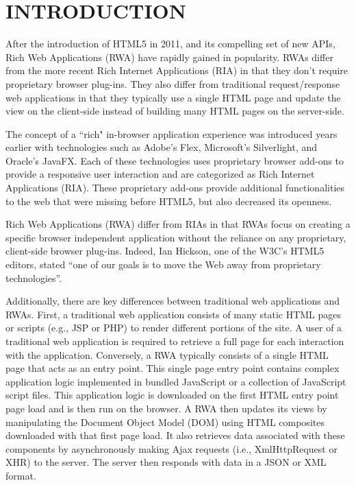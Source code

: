 \chapter{\uppercase{INTRODUCTION}}
\thispagestyle{empty}

After the introduction of HTML5 in 2011, and its compelling set of new APIs\cite{hickson2010html5}, Rich Web Applications (RWA) have rapidly gained in popularity.  RWAs differ from the more recent Rich Internet Applications (RIA) in that they don't require proprietary browser plug-ins.  They also differ from traditional request/response web applications in that they typically use a single HTML page and update the view on the client-side instead of building many HTML pages on the server-side.

The concept of a ``rich" in-browser application experience was introduced years earlier with technologies such as Adobe's Flex, Microsoft's Silverlight, and Oracle's JavaFX\cite{lawton2008new}.  Each of these technologies uses proprietary browser add-ons to provide a responsive user interaction and are categorized as Rich Internet Applications (RIA).  These proprietary add-ons provide additional functionalities to the web that were missing before HTML5, but also decreased its openness\cite{vaughan2010}.

Rich Web Applications (RWA) differ from RIAs in that RWAs focus on creating a specific browser independent application without the reliance on any proprietary, client-side browser plug-ins.  Indeed, Ian Hickson, one of the W3C’s HTML5 editors, stated ``one of our goals is to move the Web away from proprietary technologies''\cite{vaughan2010}.

Additionally, there are key differences between traditional web applications and RWAs\cite{paulson2005building}.  First, a traditional web application consists of many static HTML pages or scripts (e.g., JSP or PHP) to render different portions of the site\cite{falkner2001beginning, williams2004web}.  A user of a traditional web application is required to retrieve a full page for each interaction with the application.  Conversely, a RWA typically consists of a single HTML page that acts as an entry point.  This single page entry point contains complex application logic implemented in bundled JavaScript or a collection of JavaScript script files.  This application logic is downloaded on the first HTML entry point page load and is then run on the browser.  A RWA then updates its views by manipulating the Document Object Model (DOM) using HTML composites downloaded with that first page load.  It also retrieves data associated with these components by asynchronously making Ajax requests (i.e., XmlHttpRequest or XHR) to the server.  The server then responds with data in a JSON or XML format.

